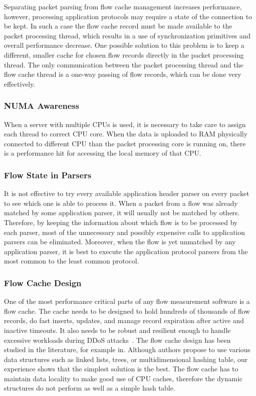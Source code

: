 Separating packet parsing from flow cache management increases performance, however, processing application protocols may require a state of the connection to be kept. In such a case the flow cache record must be made available to the packet processing thread, which results in a use of synchronization primitives and overall performance decrease. One possible solution to this problem is to keep a different, smaller cache for chosen flow records directly in the packet processing thread. The only communication between the packet processing thread and the flow cache thread is a one-way passing of flow records, which can be done very effectively.

\subsubsection{NUMA Awareness}
When a server with multiple CPUs is used, it is necessary to take care to assign each thread to correct CPU core. When the data is uploaded to RAM physically connected to different CPU than the packet processing core is running on, there is a performance hit for accessing the local memory of that CPU.

\subsubsection{Flow State in Parsers}
It is not effective to try every available application header parser on every packet to see which one is able to process it. When a packet from a flow was already matched by some application parser, it will usually not be matched by others. Therefore, by keeping the information about which flow is to be processed by each parser, most of the unnecessary and possibly expensive calls to application parsers can be eliminated. Moreover, when the flow is yet unmatched by any application parser, it is best to execute the application protocol parsers from the most common to the least common protocol.

\subsubsection{Flow Cache Design}
One of the most performance critical parts of any flow measurement software is a flow cache. The cache needs to be designed to hold hundreds of thousands of flow records, do fast inserts, updates, and manage record expiration after active and inactive timeouts. It also needs to be robust and resilient enough to handle excessive workloads during DDoS attacks~\cite{Sadre-2012-Effects}. The flow cache design has been studied in the literature, for example in\cite{Wang-2011-Memory, Nassopulos-2014-Flow}. Although authors propose to use various data structures such as linked lists, trees, or multidimensional hashing table, our experience shows that the simplest solution is the best. The flow cache has to maintain data locality to make good use of CPU caches, therefore the dynamic structures do not perform as well as a simple hash table.

